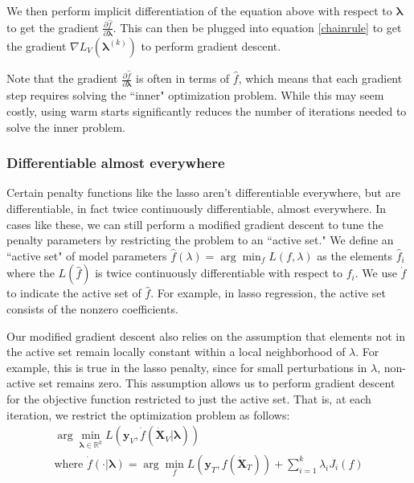 \documentclass[10pt,letterpaper]{article}
\begin{document}
We then perform implicit differentiation of the equation above with respect to $\boldsymbol{\lambda}$ to get the gradient $\frac{\partial \hat f}{\partial \boldsymbol{\lambda}}$. This can then be plugged into equation \ref{chainrule} to get the gradient $\nabla{L_V}(\boldsymbol{\lambda}^{(k)})$ to perform gradient descent.

Note that the gradient $\frac{\partial \hat f}{\partial \boldsymbol{\lambda}}$ is often in terms of $\hat f$, which means that each gradient step requires solving the ``inner" optimization problem. While this may seem costly, using warm starts significantly reduces the number of iterations needed to solve the inner problem.

\subsubsection{Differentiable almost everywhere}

Certain penalty functions like the lasso aren't differentiable everywhere, but are differentiable, in fact twice continuously differentiable, almost everywhere. In cases like these, we can still perform a modified gradient descent to tune the penalty parameters by restricting the problem to an ``active set." We define an ``active set" of model parameters $\hat f(\lambda) = \arg \min_f L(f, \lambda)$ as the elements $\hat f_i$ where the $L(\hat f)$ is twice continuously differentiable with respect to $f_i$. We use $\dot f$ to indicate the active set of $\hat f$. For example, in lasso regression, the active set consists of the nonzero coefficients.

Our modified gradient descent also relies on the assumption that elements not in the active set remain locally constant within a local neighborhood of $\lambda$. For example, this is true in the lasso penalty, since for small perturbations in $\lambda$, non-active set remains zero. This assumption allows us to perform gradient descent for the objective function restricted to just the active set. That is, at each iteration, we restrict the optimization problem as follows:
\begin{equation}
\begin{array}{c}
\arg \min_{\boldsymbol{\lambda} \in \mathbb{R}^k} L(\boldsymbol{y}_V, \dot f(\dot{\boldsymbol{X}}_V | \boldsymbol{\lambda})) \\
\text{where } \dot f(\cdot | \boldsymbol{\lambda}) = \arg \min_f L(\boldsymbol{y}_T, f (\dot{\boldsymbol{X}}_T)) + \sum\limits_{i=1}^k \lambda_i J_i(f)
\end{array}
\label{restrictedjointopt}
\end{equation}
\end{document}
